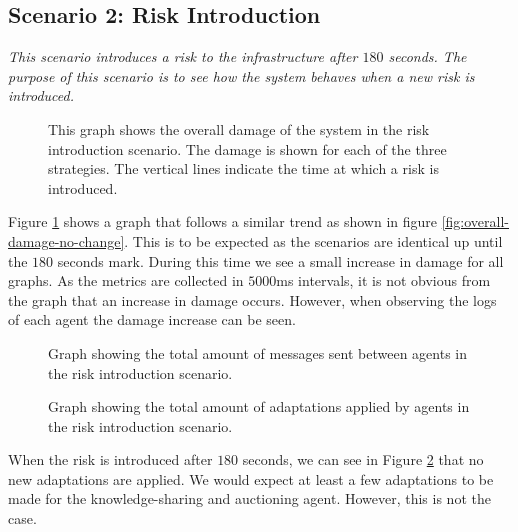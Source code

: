 \subsection{Scenario 2: Risk Introduction}
\textit{This scenario introduces a risk to the infrastructure after $180$ seconds. The purpose of this scenario is to see how the system behaves when a new risk is introduced.}

\begin{figure}[H]
    \centering
    
    \caption{This graph shows the overall damage of the system in the risk introduction scenario. The damage is shown for each of the three strategies. The vertical lines indicate the time at which a risk is introduced.}
    \label{fig:overall-damage-inroduce-risk}
\end{figure}

Figure \ref{fig:overall-damage-inroduce-risk} shows a graph that follows a similar trend as shown in figure \ref{fig:overall-damage-no-change}. This is to be expected as the scenarios are identical up until the $180$ seconds mark. During this time we see a small increase in damage for all graphs. As the metrics are collected in $5000$ms intervals, it is not obvious from the graph that an increase in damage occurs. However, when observing the logs of each agent the damage increase can be seen. 

\begin{figure}[H]
    \centering
    
    \caption{Graph showing the total amount of messages sent between agents in the risk introduction scenario.}
\end{figure}
\begin{figure}[H]
    \centering
    
    \caption{Graph showing the total amount of adaptations applied by agents in the risk introduction scenario.}
    \label{fig:proposals-risk-introduction}
\end{figure}

When the risk is introduced after $180$ seconds, we can see in Figure \ref{fig:proposals-risk-introduction} that no new adaptations are applied. We would expect at least a few adaptations to be made for the knowledge-sharing and auctioning agent. However, this is not the case.

